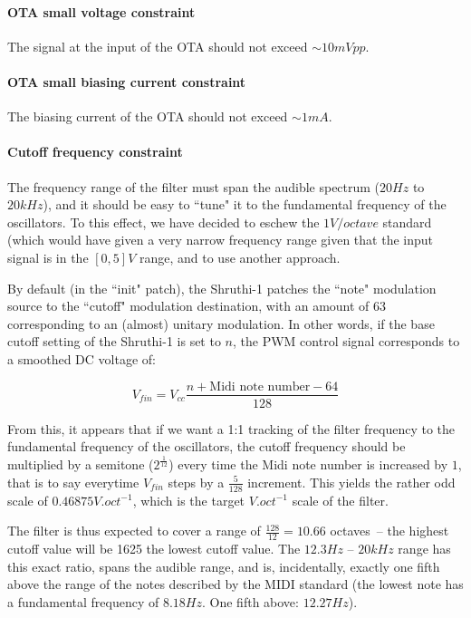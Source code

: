 \documentclass[a4paper,11pt]{article}
\begin{document}
\paragraph{OTA small voltage constraint} The signal at the input of the OTA should not exceed $\sim 10mV pp$.

\paragraph{OTA small biasing current constraint} The biasing current of the OTA should not exceed $\sim 1mA$.

\paragraph{Cutoff frequency constraint} The frequency range of the filter must span the audible spectrum ($20 Hz$ to $20kHz$), and it should be easy to ``tune" it to the fundamental frequency of the oscillators. To this effect, we have decided to eschew the $1 V/octave$ standard (which would have given a very narrow frequency range given that the input signal is in the $[0, 5]V$ range, and to use another approach.

By default (in the ``init" patch), the Shruthi-1 patches the ``note" modulation source to the ``cutoff" modulation destination, with an amount of 63 corresponding to an (almost) unitary modulation. In other words, if the base cutoff setting of the Shruthi-1 is set to $n$, the PWM control signal corresponds to a smoothed DC voltage of:

\begin{equation}
V_{fin} = V_{cc} \frac{n + \mbox{Midi note number} - 64}{128}
\end{equation}

From this, it appears that if we want a 1:1 tracking of the filter frequency to the fundamental frequency of the oscillators, the cutoff frequency should be multiplied by a semitone ($2^\frac{1}{12}$) every time the Midi note number is increased by $1$, that is to say everytime $V_{fin}$ steps by a $\frac{5}{128}$ increment. This yields the rather odd scale of $0.46875V.oct^{-1}$, which is the target $V.oct^{-1}$ scale of the filter.

The filter is thus expected to cover a range of $\frac{128}{12} = 10.66$ octaves~-- the highest cutoff value will be 1625 the lowest cutoff value. The $12.3 Hz$ -- $20kHz$ range has this exact ratio, spans the audible range, and is, incidentally, exactly one fifth above the range of the notes described by the MIDI standard (the lowest note has a fundamental frequency of $8.18 Hz$. One fifth above: $12.27 Hz$).
\end{document}
